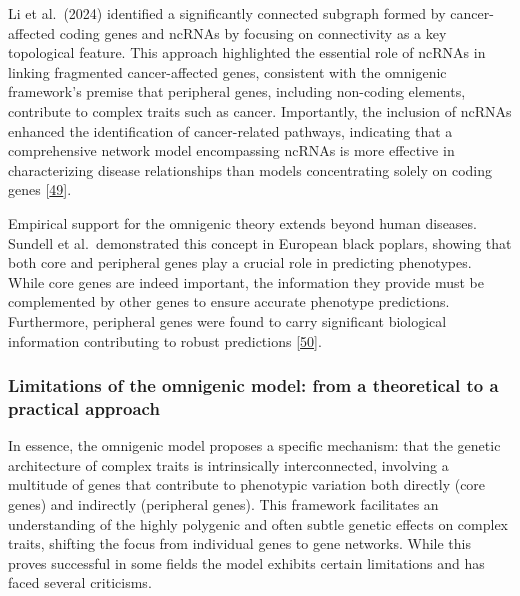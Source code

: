 Li et al.~(2024) identified a significantly connected subgraph formed by cancer-affected coding genes and ncRNAs by focusing on connectivity as a key topological feature.
This approach highlighted the essential role of ncRNAs in linking fragmented cancer-affected genes, consistent with the omnigenic framework's premise that peripheral genes, including non-coding elements, contribute to complex traits such as cancer.
Importantly, the inclusion of ncRNAs enhanced the identification of cancer-related pathways, indicating that a comprehensive network model encompassing ncRNAs is more effective in characterizing disease relationships than models concentrating solely on coding genes {[}\protect\hyperlink{ref-13VkGrWQR}{49}{]}.

Empirical support for the omnigenic theory extends beyond human diseases.
Sundell et al.~demonstrated this concept in European black poplars, showing that both core and peripheral genes play a crucial role in predicting phenotypes.
While core genes are indeed important, the information they provide must be complemented by other genes to ensure accurate phenotype predictions.
Furthermore, peripheral genes were found to carry significant biological information contributing to robust predictions {[}\protect\hyperlink{ref-EgquVUSg}{50}{]}.

\hypertarget{limitations-of-the-omnigenic-model-from-a-theoretical-to-a-practical-approach}{%
\subsubsection{Limitations of the omnigenic model: from a theoretical to a practical approach}\label{limitations-of-the-omnigenic-model-from-a-theoretical-to-a-practical-approach}}

In essence, the omnigenic model proposes a specific mechanism: that the genetic architecture of complex traits is intrinsically interconnected, involving a multitude of genes that contribute to phenotypic variation both directly (core genes) and indirectly (peripheral genes).
This framework facilitates an understanding of the highly polygenic and often subtle genetic effects on complex traits, shifting the focus from individual genes to gene networks.
While this proves successful in some fields the model exhibits certain limitations and has faced several criticisms.

